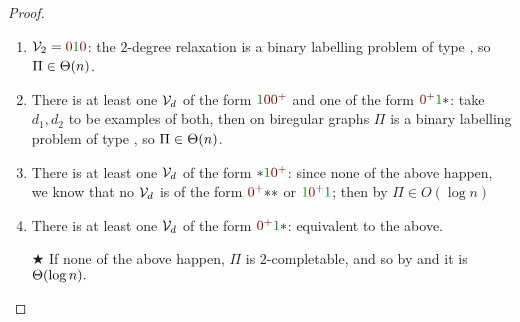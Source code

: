 \documentclass[12pt,a4paper]{article}
\begin{document}
\begin{proof}
\begin{enumerate}
        \item $\Vc_2=\n\y\n$: the $2$-degree relaxation is a binary labelling problem of type , so $\Pi\in\Theta(n)$.
        \item There is at least one $\mathcal{V}_d$ of the form $\y\n\npl$ and one of the form $\npl\y\x$: take $d_1,d_2$ to be examples of both, then on biregular graphs $\Pi$ is a binary labelling problem of type , so $\Pi\in\Theta(n)$.  
        \item There is at least one $\mathcal{V}_d$ of the form $\x\y\npl$: since none of the above happen, we know that no $\mathcal{V}_d$ is of the form $\npl\x\x$ or $\y\npl\y$; then by  $\Pi\in O(\log n)$
        \item There is at least one $\mathcal{V}_d$ of the form $\npl\y\x$: equivalent to the above.
        \item[$\bigstar$] If none of the above happen, $\Pi$ is $2$-completable, and so by  and  it is $\Theta(\log n).$\qedhere
    \end{enumerate}
\end{proof}
\end{document}
